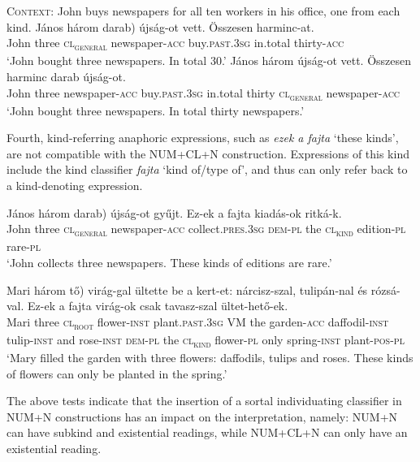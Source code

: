 \documentclass[output=paper]{langscibook}
\begin{document}
\ea \label{schv-nem:ex:17} \textsc{Context}: John buys newspapers for all ten workers in his office, one from each kind.
\ea \label{schv-nem:ex:17b}
\gll János három \minsp{(*} darab) újság-ot vett. Összesen  harminc-at. \\
John  three {} \textsc{cl\textsubscript{general}} newspaper-\textsc{acc} buy.\textsc{past}.\textsc{3sg} in.total thirty-\textsc{acc}\\
\glt `John bought three newspapers. In total 30.'
\ex \label{schv-nem:ex:17c} 
\gll János három újság-ot vett. Összesen harminc darab újság-ot. \\
John  three  newspaper-\textsc{acc} buy.\textsc{past}.\textsc{3sg} in.total thirty \textsc{cl\textsubscript{general}} newspaper-\textsc{acc}\\
\glt `John bought three newspapers. In total thirty newspapers.'
\z
\z

\noindent Fourth, kind-referring anaphoric expressions, such as \textit{ezek a fajta} `these kinds', are not compatible with the NUM+CL+N construction. Expressions of this kind include the kind classifier \textit{fajta} `kind of/type of', and thus can only refer back to a kind-denoting expression.

\ea \label{schv-nem:ex:18}
\gll János három \minsp{(*} darab) újság-ot gyűjt. Ez-ek a fajta kiadás-ok ritká-k. \\
John three {} \textsc{cl\textsubscript{general}} newspaper-\textsc{acc} collect.\textsc{pres}.\textsc{3sg} \textsc{dem}-\textsc{pl} the \textsc{cl\textsubscript{kind}} edition-\textsc{pl} rare-\textsc{pl}\\
\glt `John collects three newspapers. These kinds of editions are rare.'
\z 

\ea \label{schv-nem:ex:19}
\gll Mari három \minsp{(*} tő) virág-gal ültette be a kert-et: nárcisz-szal, tulipán-nal és rózsá-val. Ez-ek a fajta virág-ok csak tavasz-szal ültet-hető-ek. \\
Mari three {} \textsc{cl\textsubscript{root}} flower-\textsc{inst} plant.\textsc{past}.\textsc{3sg} VM the garden-\textsc{acc} daffodil-\textsc{inst} tulip-\textsc{inst} and rose-\textsc{inst}  \textsc{dem}-\textsc{pl} the \textsc{cl\textsubscript{kind}} flower-\textsc{pl} only spring-\textsc{inst} plant-\textsc{pos}-\textsc{pl}\\
\glt ‘Mary filled the garden with three flowers: daffodils, tulips and roses. These kinds of flowers can only be planted in the spring.'
\z 

\noindent The above tests indicate that the insertion of a sortal individuating classifier in NUM+N constructions has an impact on the interpretation, namely: NUM+N can have subkind and existential readings, while NUM+CL+N can only have an existential reading.
\end{document}
